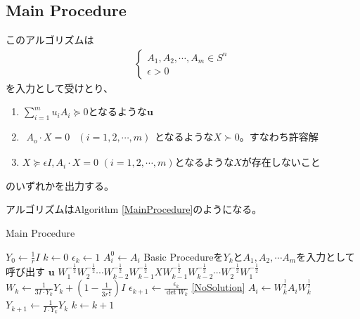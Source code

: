 \subsection{Main Procedure}
このアルゴリズムは
\begin{align*}
  \left\{
    \begin{array}{l}
      A_1, A_2, \cdots, A_m \in S^n \\
      \epsilon > 0
    \end{array}
  \right.
\end{align*}
を入力として受けとり、
\begin{enumerate}[label=(\alph*)]
  \item $\displaystyle{\sum_{i = 1}^m u_i A_i \succeq 0}$となるような$\mathbf{u}$ \label{DualSolution}
  \item $\begin{array}{ll} A_o \cdot X = 0 & (i = 1, 2, \cdots, m) \end{array}$となるような$X \succ 0$。すなわち許容解 \label{FeasibleSolution}
  \item $X \succeq \epsilon I, A_i \cdot X = 0 \,\, (i = 1, 2, \cdots, m)$となるような$X$が存在しないこと \label{NoSolution}
\end{enumerate}
のいずれかを出力する。

アルゴリズムはAlgorithm \ref{MainProcedure}のようになる。
\begin{algorithm}
  \caption{Main Procedure}
  \label{MainProcedure}
  \begin{algorithmic}[1]
    \State $\displaystyle{Y_0 \leftarrow \frac{1}{r} I}$
    \State $k \leftarrow 0$
    \State $\epsilon_k \leftarrow 1$
      \State $A_i^0 \leftarrow A_i$
    \EndFor
    \State Basic Procedureを$Y_k$と$A_1, A_2, \cdots A_m$を入力として呼び出す \label{CallBasicProcedure}
      \State \Return $\mathbf{u}$
      \State \Return $\displaystyle{W_1^{-\frac{1}{2}} W_2^{-\frac{1}{2}} \cdots W_{k - 2}^{-\frac{1}{2}} W_{k - 1}^{-\frac{1}{2}} X W_{k - 1}^{-\frac{1}{2}} W_{k - 2}^{-\frac{1}{2}} \cdots W_2^{-\frac{1}{2}} W_1^{-\frac{1}{2}}}$
    \EndIf
    \State $\displaystyle{W_k \leftarrow \frac{1}{3 I \cdot Y_k} Y_k + (1 - \frac{1}{3 r^\frac{3}{2}}) I}$
    \State $\displaystyle{\epsilon_{k + 1} \leftarrow \frac{\epsilon_k}{\det W_k}}$
      \State \Return \ref{NoSolution}
    \EndIf
      \State $\displaystyle{A_i \leftarrow W_k^\frac{1}{2} A_i W_k^\frac{1}{2}}$
    \EndFor
    \State $\displaystyle{Y_{k + 1} \leftarrow \frac{1}{I \cdot Y_k} Y_k}$
    \State $k \leftarrow k + 1$
    \State {}
  \end{algorithmic}
\end{algorithm}


